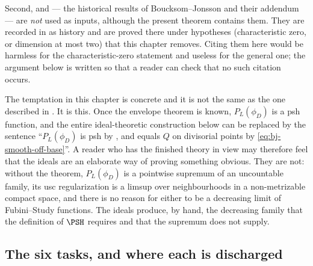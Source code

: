 Second,  and
 --- the historical results of
Boucksom--Jonsson and their addendum --- are \emph{not} used as inputs,
although the present theorem contains them.  They are recorded in
 as history and are proved there under
hypotheses (characteristic zero, or dimension at most two) that this chapter
removes.  Citing them here would be harmless for the characteristic-zero
statement and useless for the general one; the argument below is written so
that a reader can check that no such citation occurs.

\begin{remark}
\label{rem:ch40-firewall-not-vacuous}
The temptation in this chapter is concrete and it is not the same as the one
described in .  It is this.  Once the
envelope theorem is known, $P_L(\phi_D)$ is a psh function, and the entire
ideal-theoretic construction below can be replaced by the sentence
``$P_L(\phi_D)$ is psh by , and equals $Q$ on
divisorial points by \eqref{eq:bj-smooth-off-base}''.  A reader who has the
finished theory in view may therefore feel that the ideals are an elaborate
way of proving something obvious.  They are not: without the theorem,
$P_L(\phi_D)$ is a pointwise supremum of an uncountable family, its usc
regularization is a limsup over neighbourhoods in a non-metrizable compact
space, and there is no reason for either to be a decreasing limit of
Fubini--Study functions.  The ideals produce, by hand, the decreasing family
that the definition of $\PSH$ requires and that the supremum does not
supply.
\end{remark}

\subsection{The six tasks, and where each is discharged}
\label{sec:ch40-tasks}

